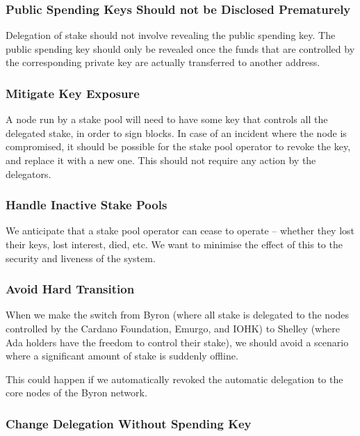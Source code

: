 \documentclass[11pt,a4paper]{article}
\begin{document}
\subsubsection{Public Spending Keys Should not be Disclosed
Prematurely}\label{public-spending-keys-should-not-be-disclosed-prematurely}

Delegation of stake should not involve revealing the public spending
key. The public spending key should only be revealed once the funds that
are controlled by the corresponding private key are actually transferred
to another address.

\subsubsection{Mitigate Key Exposure}\label{mitigate-key-exposure}

A node run by a stake pool will need to have some key that controls all
the delegated stake, in order to sign blocks. In case of an incident
where the node is compromised, it should be possible for the stake pool
operator to revoke the key, and replace it with a new one. This should
not require any action by the delegators.

\subsubsection{Handle Inactive Stake
Pools}\label{handle-inactive-stake-pools}

We anticipate that a stake pool operator can cease to operate -- whether
they lost their keys, lost interest, died, etc. We want to minimise the
effect of this to the security and liveness of the system.

\subsubsection{Avoid Hard Transition}\label{avoid-hard-transition}

When we make the switch from Byron (where all stake is delegated to the
nodes controlled by the Cardano Foundation, Emurgo, and IOHK) to Shelley
(where Ada holders have the freedom to control their stake), we should
avoid a scenario where a significant amount of stake is suddenly
offline.

This could happen if we automatically revoked the automatic delegation
to the core nodes of the Byron network.

\subsubsection{Change Delegation Without Spending
Key}\label{change-delegation-without-spending-key}
\end{document}
